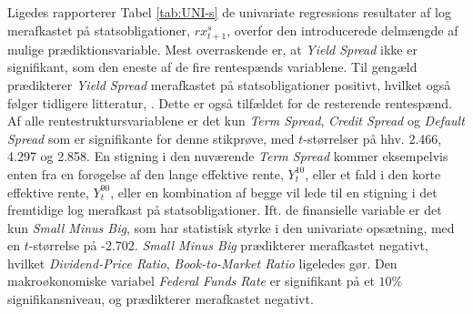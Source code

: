 \documentclass[
  a4paper,
  oneside]{memoir}
\begin{document}
\begin{table}[!h]
\begin{threeparttable}
\begin{tablenotes}
\end{tablenotes}
\end{threeparttable}
\end{table}

Ligedes rapporterer Tabel \ref{tab:UNI-s} de univariate regressions resultater af log merafkastet på statsobligationer, \(rx_{t+1}^s\), overfor den introducerede delmængde af mulige prædiktionsvariable. Mest overraskende er, at \emph{Yield Spread} ikke er signifikant, som den eneste af de fire rentespænds variablene. Til gengæld prædikterer \emph{Yield Spread} merafkastet på statsobligationer positivt, hvilket også følger tidligere litteratur, \citep{Fama1987}. Dette er også tilfældet for de resterende rentespænd. Af alle rentestruktursvariablene er det kun \emph{Term Spread}, \emph{Credit Spread} og \emph{Default Spread} som er signifikante for denne stikprøve, med \(t\)-størrelser på hhv. 2.466, 4.297 og 2.858. En stigning i den nuværende \emph{Term Spread} kommer eksempelvis enten fra en forøgelse af den lange effektive rente, \(Y_t^10\), eller et fald i den korte effektive rente, \(Y_t^90\), eller en kombination af begge vil lede til en stigning i det fremtidige log merafkast på statsobligationer. Ift. de finansielle variable er det kun \emph{Small Minus Big}, som har statistisk styrke i den univariate opsætning, med en \(t\)-størrelse på -2.702. \emph{Small Minus Big} prædikterer merafkastet negativt, hvilket \emph{Dividend-Price Ratio}, \emph{Book-to-Market Ratio} ligeledes gør. Den makroøkonomiske variabel \emph{Federal Funds Rate} er signifikant på et \(10\%\) signifikansniveau, og prædikterer merafkastet negativt.
\end{document}
